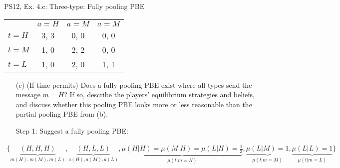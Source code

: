 \begin{frame}{PS12, Ex. 4.c: Three-type: Fully pooling PBE}
    \begin{table}
      \begin{tabular}{l|c|c|c|}
          \multicolumn{1}{c}{} & \multicolumn{1}{c}{$a=H$} & \multicolumn{1}{c}{$a=M$} & \multicolumn{1}{c}{$a=M$} \\\cline{2-4}
          $t=H$ & 3, 3 & 0, 0 & 0, 0 \\\cline{2-4}
          $t=M$ & 1, 0 & 2, 2 & 0, 0 \\\cline{2-4}
          $t=L$ & 1, 0 & 2, 0 & 1, 1 \\\cline{2-4}
      \end{tabular}
    \end{table}\vspace{-8pt}
    \begin{itemize}
      \item[(c)] (If time permits) Does a fully pooling PBE exist where all types send the message $m = H$? If so, describe the players’ equilibrium strategies and beliefs, and discuss whether this pooling PBE looks more or less reasonable than the partial pooling PBE from (b).
      \item[Step 1:] Suggest a fully pooling PBE:
    \end{itemize}\vspace{-12pt}
    \begin{align*}
      \{\underbrace{(H,H,H)}_{m(H),m(M),m(L)},\underbrace{(H,L,L)}_{a(H),a(M),a(L)},\underbrace{\mu(H|H)=\mu(M|H)=\mu(L|H)=\frac{1}{3}}_{\mu(t|m=H)},\underbrace{\mu(L|M)=1}_{\mu(t|m=M)},\underbrace{\mu(L|L)=1}_{\mu(t|m=L)}\}
    \end{align*}
    \vfill\null
\end{frame}
